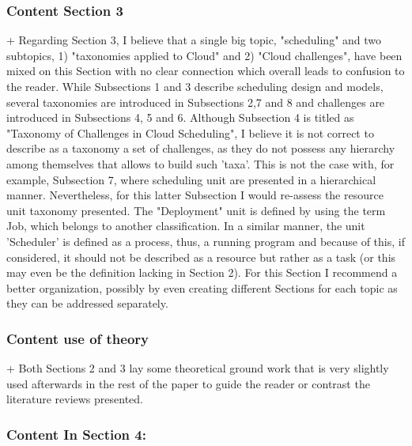 

\subsubsection{Content Section 3}

+ Regarding Section 3, I believe that a single big topic, "scheduling"
and two subtopics, 1) "taxonomies applied to Cloud" and 2) "Cloud
challenges", have been mixed on this Section with no clear connection
which overall leads to confusion to the reader. While Subsections 1
and 3 describe scheduling design and models, several taxonomies are
introduced in Subsections 2,7 and 8 and challenges are introduced in
Subsections 4, 5 and 6. Although Subsection 4 is titled as "Taxonomy
of Challenges in Cloud Scheduling", I believe it is not correct to
describe as a taxonomy a set of challenges, as they do not possess any
hierarchy among themselves that allows to build such 'taxa'. This is
not the case with, for example, Subsection 7, where scheduling unit
are presented in a hierarchical manner. Nevertheless, for this latter
Subsection I would re-assess the resource unit taxonomy presented. The
"Deployment" unit is defined by using the term Job, which belongs to
another classification. In a similar manner, the unit 'Scheduler' is
defined as a process, thus, a running program and because of this, if
considered, it should not be described as a resource but rather as a
task (or this may even be the definition lacking in Section 2). For
this Section I recommend a better organization, possibly by even
creating different Sections for each topic as they can be addressed
separately.



\subsubsection{Content use of theory}

+ Both Sections 2 and 3 lay some theoretical ground work that is very
slightly used afterwards in the rest of the paper to guide the reader
or contrast the literature reviews presented.



\subsubsection{Content In Section 4:}

